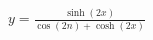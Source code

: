 \documentclass[preview]{standalone}
\begin{document}
\begin{align*}
y = \frac{\sinh(2x)}{\cos(2n)+\cosh(2x)}
\end{align*}
\end{document}
